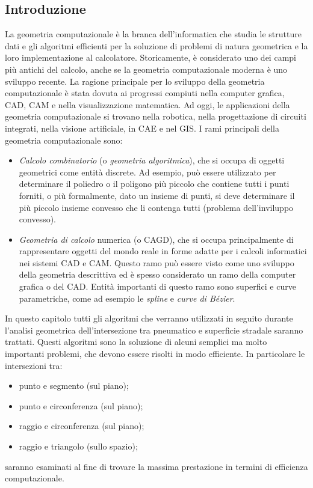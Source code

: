 \subsection{Introduzione}
La geometria computazionale è la branca dell'informatica che studia le strutture dati e gli algoritmi efficienti per la soluzione di problemi di natura geometrica e la loro implementazione al calcolatore. Storicamente, è considerato uno dei campi più antichi del calcolo, anche se la geometria computazionale moderna è uno sviluppo recente. La ragione principale per lo sviluppo della geometria computazionale è stata dovuta ai progressi compiuti nella computer grafica, \ac{CAD}, \ac{CAM} e nella visualizzazione matematica. Ad oggi, le applicazioni della geometria computazionale si trovano nella robotica, nella progettazione di circuiti integrati, nella visione artificiale, in \ac{CAE} e nel \ac{GIS}. I rami principali della geometria computazionale sono:
\begin{itemize}
	\item \textit{Calcolo combinatorio} (o \textit{geometria algoritmica}), che si occupa di oggetti geometrici come entità discrete. Ad esempio, può essere utilizzato per determinare il poliedro o il poligono più piccolo che contiene tutti i punti forniti, o più formalmente, dato un insieme di punti, si deve determinare il più piccolo insieme convesso che li contenga tutti (problema dell'inviluppo convesso).
	\item \textit{Geometria di calcolo} numerica (o \ac{CAGD}), che si occupa principalmente di rappresentare oggetti del mondo reale in forme adatte per i calcoli informatici nei sistemi \ac{CAD} e \ac{CAM}. Questo ramo può essere visto come uno sviluppo della geometria descrittiva ed è spesso considerato un ramo della computer grafica o del \ac{CAD}. Entità importanti di questo ramo sono superfici e curve parametriche, come ad esempio le \textit{spline} e \textit{curve di Bézier}.
\end{itemize}

In questo capitolo tutti gli algoritmi che verranno utilizzati in seguito durante l'analisi geometrica dell'intersezione tra pneumatico e superficie stradale saranno trattati. Questi algoritmi sono la soluzione di alcuni semplici ma molto importanti problemi, che devono essere risolti in modo efficiente. In particolare le intersezioni tra:
\begin{itemize}
	\item punto e segmento (sul piano);
	\item punto e circonferenza (sul piano);
	\item raggio e circonferenza (sul piano);
	\item raggio e triangolo (sullo spazio);
\end{itemize}
saranno esaminati al fine di trovare la massima prestazione in termini di efficienza computazionale.
%
